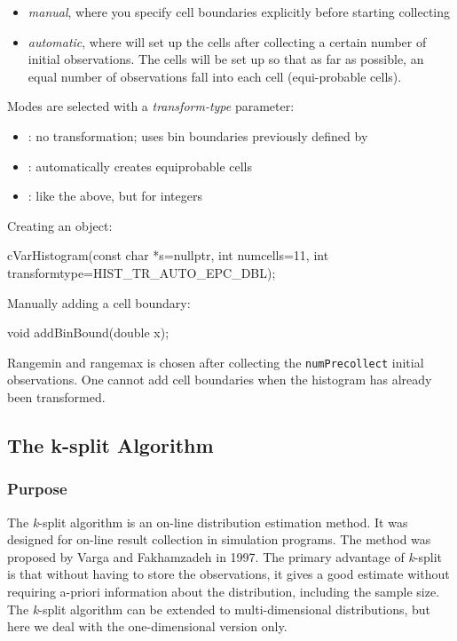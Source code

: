 \begin{itemize}
  \item \textit{manual}, where you specify cell boundaries explicitly
     before starting collecting
  \item \textit{automatic}, where  will set up the cells
     after collecting a certain number of initial observations. The cells
     will be set up so that as far as possible, an equal number of observations
     fall into each cell (equi-probable cells).
\end{itemize}

Modes are selected with a \textit{transform-type} parameter:
\begin{itemize}
  \item{: no transformation; uses bin boundaries
    previously defined by }
  \item{: automatically creates equiprobable cells}
  \item{: like the above, but for integers}
\end{itemize}

Creating an object:

\begin{cpp}
cVarHistogram(const char *s=nullptr,
              int numcells=11,
              int transformtype=HIST_TR_AUTO_EPC_DBL);
\end{cpp}

Manually adding a cell boundary:

\begin{cpp}
void addBinBound(double x);
\end{cpp}

Rangemin and rangemax is chosen after collecting the
\texttt{numPrecollect} initial observations. One cannot add cell
boundaries when the histogram has already been transformed.





\subsection{The k-split Algorithm}

\subsubsection{Purpose}


The \textit{k}-split algorithm is an on-line distribution
estimation method.  It was
designed for on-line result collection in simulation programs.  The
method was proposed by Varga and Fakhamzadeh in 1997. The primary
advantage of \textit{k}-split is that without having to store the
observations, it gives a good estimate without requiring a-priori
information about the distribution, including the sample size. The
\textit{k}-split algorithm can be extended to multi-dimensional
distributions, but here we deal
with the one-dimensional version only.


